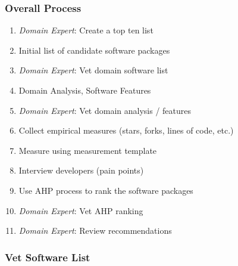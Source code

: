 \documentclass[t,12pt,numbers,fleqn]{beamer}
\begin{document}

\begin{frame}
\frametitle{Overall Process}

\begin{enumerate}
\item \emph{Domain Expert}: Create a top ten list
\item Initial list of candidate software packages
\item \emph{Domain Expert}: Vet domain software list
\item Domain Analysis, Software Features
\item \emph{Domain Expert}: Vet domain analysis / features
\item Collect empirical measures (stars, forks, lines of code, etc.)
\item Measure using measurement template
\item Interview developers (pain points)
\item Use AHP process to rank the software packages
\item \emph{Domain Expert}: Vet AHP ranking
\item \emph{Domain Expert}: Review recommendations %
\end{enumerate}

\end{frame}


\begin{frame}
\frametitle{Vet Software List}

\bi
\item {}
\item {}
\item {}
\item {}
\ei
  
\end{frame}

\end{document}
